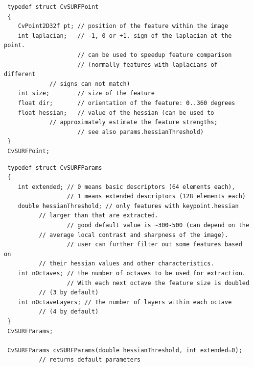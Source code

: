 \begin{description}
\begin{lstlisting}
 typedef struct CvSURFPoint
 {
    CvPoint2D32f pt; // position of the feature within the image
    int laplacian;   // -1, 0 or +1. sign of the laplacian at the point.
                     // can be used to speedup feature comparison
                     // (normally features with laplacians of different 
             // signs can not match)
    int size;        // size of the feature
    float dir;       // orientation of the feature: 0..360 degrees
    float hessian;   // value of the hessian (can be used to 
             // approximately estimate the feature strengths;
                     // see also params.hessianThreshold)
 }
 CvSURFPoint;
\end{lstlisting}
\begin{lstlisting}
 typedef struct CvSURFParams
 {
    int extended; // 0 means basic descriptors (64 elements each),
                  // 1 means extended descriptors (128 elements each)
    double hessianThreshold; // only features with keypoint.hessian 
          // larger than that are extracted.
                  // good default value is ~300-500 (can depend on the 
          // average local contrast and sharpness of the image).
                  // user can further filter out some features based on 
          // their hessian values and other characteristics.
    int nOctaves; // the number of octaves to be used for extraction.
                  // With each next octave the feature size is doubled 
          // (3 by default)
    int nOctaveLayers; // The number of layers within each octave 
          // (4 by default)
 }
 CvSURFParams;

 CvSURFParams cvSURFParams(double hessianThreshold, int extended=0); 
          // returns default parameters
\end{lstlisting}
\end{description}

